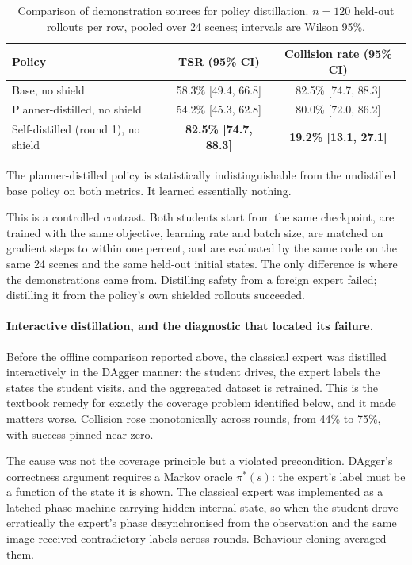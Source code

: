\begin{table}[htbp]
\centering
\caption{Comparison of demonstration sources for policy distillation. $n = 120$ held-out rollouts
  per row, pooled over 24 scenes; intervals are Wilson 95\%.}
\label{tab:demo_source_comparison}
\begin{tabular}{lcc}
\toprule
\textbf{Policy} & \textbf{TSR (95\% CI)} & \textbf{Collision rate (95\% CI)} \\
\midrule
Base, no shield                     & 58.3\% [49.4, 66.8] & 82.5\% [74.7, 88.3] \\
Planner-distilled, no shield        & 54.2\% [45.3, 62.8] & 80.0\% [72.0, 86.2] \\
Self-distilled (round 1), no shield & \textbf{82.5\% [74.7, 88.3]} & \textbf{19.2\% [13.1, 27.1]} \\
\bottomrule
\end{tabular}
\end{table}

The planner-distilled policy is statistically indistinguishable from the undistilled base policy on
both metrics. It learned essentially nothing.

This is a controlled contrast. Both students start from the same checkpoint, are trained with the
same objective, learning rate and batch size, are matched on gradient steps to within one percent,
and are evaluated by the same code on the same 24 scenes and the same held-out initial states. The
only difference is where the demonstrations came from. Distilling safety from a foreign expert
failed; distilling it from the policy's own shielded rollouts succeeded.

\paragraph{Interactive distillation, and the diagnostic that located its failure.}
Before the offline comparison reported above, the classical expert was distilled interactively in
the DAgger manner: the student drives, the expert labels the states the student visits, and the
aggregated dataset is retrained. This is the textbook remedy for exactly the coverage problem
identified below, and it made matters worse. Collision rose monotonically across rounds, from 44\%
to 75\%, with success pinned near zero.

The cause was not the coverage principle but a violated precondition. DAgger's correctness argument
requires a Markov oracle $\pi^{*}(s)$: the expert's label must be a function of the state it is
shown. The classical expert was implemented as a latched phase machine carrying hidden internal
state, so when the student drove erratically the expert's phase desynchronised from the observation
and the same image received contradictory labels across rounds. Behaviour cloning averaged them.

